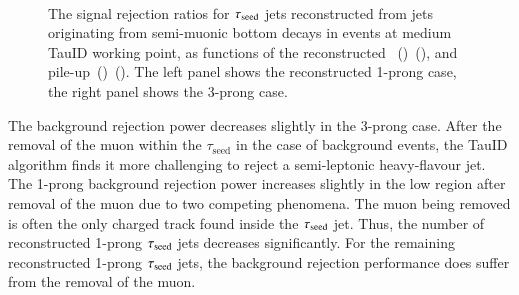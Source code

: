         \begin{figure}[hbtp]
            \begin{center}
                \vspace{-0.45cm} %
                \\
                \caption{The signal rejection ratios for $\tau_\mathrm{seed}$ jets reconstructed from jets originating from 
                semi-muonic bottom decays in \ttbar events at medium TauID working point, as functions of the 
                reconstructed \pt~(\protect{})~(\protect{}),
                and pile-up~(\protect{})~(\protect{}). 
                The left panel shows the reconstructed 1-prong case, the right panel shows the 3-prong case.}
                \label{fig:murm:rej}
            \end{center}
        \end{figure}

        The background rejection power decreases slightly in the 3-prong case. 
        After the removal of the muon within the $\tau_\mathrm{seed}$ in the case of background events, 
        the TauID algorithm finds it more challenging to reject a semi-leptonic heavy-flavour jet.
        The 1-prong background rejection power increases slightly in 
        the low \pt region after removal of the muon due to two competing phenomena. 
        The muon being removed is often the only charged track found inside the $\tau_\mathrm{seed}$ jet. 
        Thus, the number of reconstructed 1-prong $\tau_\mathrm{seed}$ jets decreases significantly. 
        For the remaining reconstructed 1-prong $\tau_\mathrm{seed}$ jets, 
        the background rejection performance does suffer from the removal of the muon. 

